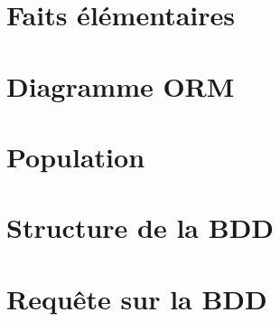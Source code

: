 
\section{Faits élémentaires}
\section{Diagramme ORM}
\section{Population}
\section{Structure de la BDD}
\section{Requête sur la BDD}
